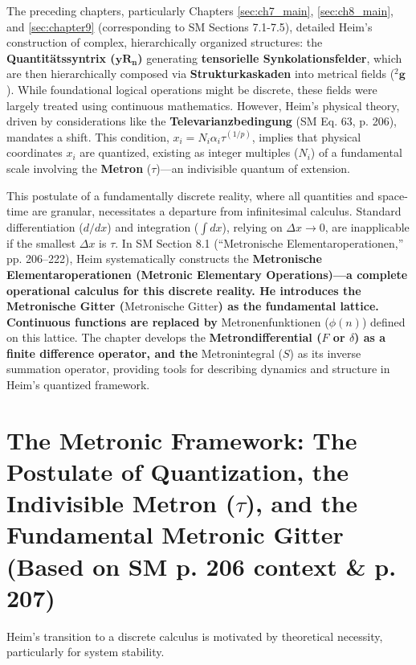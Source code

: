 \documentclass[
    12pt,              %
    a4paper,           %
    headings=normal,   %
    twoside=true,      %
    BCOR=8mm,          %
]{scrbook}
\newcommand{\q}[1]{\enquote{#1}}
\newcommand{\quantitaetssyntrix}{\bm{yR_n}}
\newcommand{\kompositionsfeld}{{}^2\mathbf{g}}
\newcommand{\metron}{\tau}
\newcommand{\metronischegitter}{\text{Metronische Gitter}}
\newcommand{\metrondifferential}{F}
\newcommand{\metronintegral}{S}
\newcommand{\metronenfunktion}{\phi(n)}
\begin{document}
The preceding chapters, particularly Chapters \ref{sec:ch7_main}, \ref{sec:ch8_main}, and \ref{sec:chapter9} (corresponding to SM Sections 7.1-7.5), detailed Heim's construction of complex, hierarchically organized structures: the \textbf{Quantitätssyntrix (\(\quantitaetssyntrix\))} generating \textbf{tensorielle Synkolationsfelder}, which are then hierarchically composed via \textbf{Strukturkaskaden} into metrical fields (\(\kompositionsfeld\)). While foundational logical operations might be discrete, these fields were largely treated using continuous mathematics. However, Heim’s physical theory, driven by considerations like the \textbf{Televarianzbedingung} (SM Eq. 63, p. 206), mandates a shift. This condition, \(x_i = N_i \alpha_i \tau^{(1/p)}\), implies that physical coordinates \(x_i\) are quantized, existing as integer multiples (\(N_i\)) of a fundamental scale involving the \textbf{Metron} (\(\metron\))—an indivisible quantum of extension.

This postulate of a fundamentally discrete reality, where all quantities and space-time are granular, necessitates a departure from infinitesimal calculus. Standard differentiation (\(d/dx\)) and integration (\(\int dx\)), relying on \(\Delta x \to 0\), are inapplicable if the smallest \(\Delta x\) is \(\metron\).
In SM Section 8.1 (\q{Metronische Elementaroperationen,} pp. 206–222), Heim systematically constructs the \textbf{Metronische Elementaroperationen (Metronic Elementary Operations)—a complete operational calculus for this discrete reality. He introduces the \textbf{Metronische Gitter (\(\metronischegitter\))} as the fundamental lattice. Continuous functions are replaced by }Metronenfunktionen (\(\metronenfunktion\)) defined on this lattice. The chapter develops the \textbf{Metrondifferential (\(\metrondifferential\) or \( \delta \)) as a finite difference operator, and the }Metronintegral (\(\metronintegral\)) as its inverse summation operator, providing tools for describing dynamics and structure in Heim’s quantized framework.

\section{The Metronic Framework: The Postulate of Quantization, the Indivisible Metron (\(\metron\)), and the Fundamental Metronic Gitter (Based on SM p. 206 context \& p. 207)}
\label{sec:ch10_1_metronic_framework}

Heim’s transition to a discrete calculus is motivated by theoretical necessity, particularly for system stability.
\end{document}
